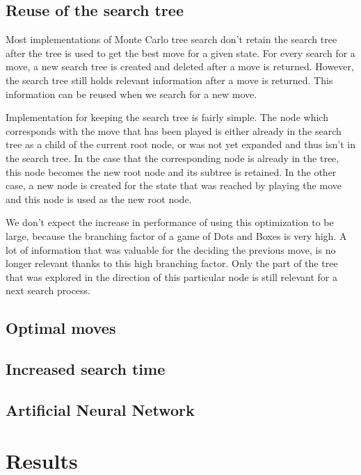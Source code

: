 \documentclass[11pt,a4paper,titlepage]{article}
\begin{document}
	\subsection{Reuse of the search tree}
	Most implementations of Monte Carlo tree search don't retain the search tree after the tree is used to get the best move for a given state. For every search for a move, a new search tree is created and deleted after a move is returned.
	However, the search tree still holds relevant information after a move is returned. This information can be reused when we search for a new move. 
	
	Implementation for keeping the search tree is fairly simple. The node which corresponds with the move that has been played is either already in the search tree as a child of the current root node, or was not yet expanded and thus isn't in the search tree. In the case that the corresponding node is already in the tree, this node becomes the new root node and its subtree is retained. In the other case, a new node is created for the state that was reached by playing the move and this node is used as the new root node.
	
	We don't expect the increase in performance of using this optimization to be large, because the branching factor of a game of Dots and Boxes is very high. A lot of information that was valuable for the deciding the previous move, is no longer relevant thanks to this high branching factor. Only the part of the tree that was explored in the direction of this particular node is still relevant for a next search process.
	
	\subsection{Optimal moves\label{s:optimalMoves}}
	
	\subsection{Increased search time}
	
	\subsection{Artificial Neural Network}
	
	\section{Results}


	\newpage
	
	
\end{document}

